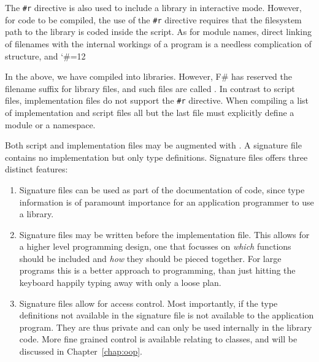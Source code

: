 \endgroup
 The \lstinline{#r} directive is also used to include a library in interactive mode. However, for code to be compiled, the use of the \lstinline{#r} directive requires that the filesystem path to the library is coded inside the script. As for module names, direct linking of filenames with the internal workings of a program is a needless complication of structure, and 
\begingroup %
\catcode`\#=12
\endgroup

In the above, we have compiled  into libraries. However, F\# has reserved the  filename suffix for library files, and such files are called . In contrast to script files, implementation files do not support the \lstinline{#r} directive. When compiling a list of implementation and script files all but the last file must explicitly define a module or a namespace.

Both script and implementation files may be augmented with . A signature file contains no implementation but only type definitions. Signature files offers three distinct features:
\begin{enumerate}
\item Signature files can be used as part of the documentation of code, since type information is of paramount importance for an application programmer to use a library. 
\item Signature files may be written before the implementation file. This allows for a higher level programming design, one that focusses on \emph{which} functions should be included and \emph{how} they should be pieced together. For large programs this is a better approach to programming, than just hitting the keyboard happily typing away with only a loose plan.
\item Signature files allow for access control. Most importantly, if the type definitions not available in the signature file is not available to the application program. They are thus private and can only be used internally in the library code. More fine grained control is available relating to classes, and will be discussed in Chapter~\ref{chap:oop}.
\end{enumerate}
 
